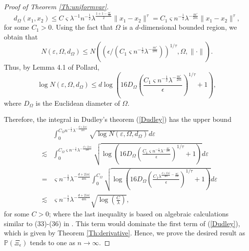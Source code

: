 \documentclass[12pt]{article}
\theoremstyle{plain}
\theoremstyle{remark}
\begin{document}
\begin{proof}[Proof of Theorem \ref{Th:uniformvar}]
\[d_\Omega(x_1,x_2)\leq C \varsigma\lambda^{-1}n^{-\frac{1}{2}}\lambda^{\frac{1+1-\frac{m'}{m}}{2}}\|x_1-x_2\|^\tau=C_1\varsigma n^{-\frac{1}{2}}\lambda^{-\frac{m'}{2m}}\|x_1-x_2\|^\tau,\]
for some $C_1>0$. Using the fact that $\Omega$ is a $d$-dimensional bounded region, we obtain that
\[N(\varepsilon,\Omega,d_\Omega)\leq N\left(\left(\epsilon/ (C_1\varsigma n^{-\frac{1}{2}}\lambda^{-\frac{m'}{2m}})\right)^{1/\tau},\Omega,\|\cdot\|\right).\]
Thus, by Lemma 4.1 of Pollard,
\[\log N(\varepsilon,\Omega,d_\Omega)\leq d \log \left(16D_\Omega\left(\frac{C_1\varsigma n^{-\frac{1}{2}}\lambda^{-\frac{m'}{2m}}}{\epsilon}\right)^{1/\tau}+1\right),\]
where $D_\Omega$ is the Euclidean diameter of $\Omega$.

Therefore, the integral in Dudley's theorem (\ref{Dudley}) has the upper bound
\begin{eqnarray*}
    &&%
    \int_0^{C_\Omega n^{-\frac{1}{2}}\lambda^{-\frac{d+2|\alpha|}{4m}}}\sqrt{\log N(\varepsilon,\Omega,d_{\Omega})}d\varepsilon\\
    &\lesssim&\int_0^{C_\Omega \varsigma n^{-\frac{1}{2}}\lambda^{-\frac{d+2|\alpha|}{4m}}}\sqrt{\log \left(16D_\Omega\left(\frac{C_1 \varsigma n^{-\frac{1}{2}}\lambda^{-\frac{m'}{2m}}}{\epsilon}\right)^{1/\tau}+1\right)}d\varepsilon\\
    &=&\varsigma n^{-\frac{1}{2}}\lambda^{-\frac{d+2|\alpha|}{4m}}\int_0^{C_\Omega }\sqrt{\log \left(16D_\Omega\left(\frac{C_1\lambda^{\frac{d+2|\alpha|}{4m}-\frac{m'}{2m}}}{\epsilon}\right)^{1/\tau}+1\right)}d\varepsilon\\
    &\lesssim&\varsigma n^{-\frac{1}{2}}\lambda^{-\frac{d+2|\alpha|}{4m}}\sqrt{\log\left(\frac{C}{\lambda}\right)},
\end{eqnarray*}
for some $C>0$; where the last inequality is based on algebraic calculations similar to (33)-(36) in \cite{tuo2020kriging}. This term would dominate the first term of (\ref{Dudley}), which is given by Theorem \ref{Th:derivative}. Hence, we prove the desired result as $\mathbb{P}(\Xi_\epsilon)$ tends to one as $n\rightarrow \infty$.
\end{proof}
\end{document}
